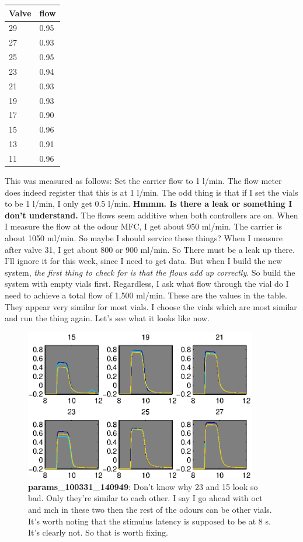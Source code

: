 \documentclass[a4paper]{report}
\begin{document}
\begin{tabular}{|l|l|}
\hline
Valve & flow \\
\hline
29&0.95\\
27&0.93\\
25&0.95\\
23&0.94\\
21&0.93\\
19&0.93\\
17&0.90\\
15&0.96\\
13&0.91\\
11&0.96\\
\hline
\end{tabular}
This was measured as follows: Set the carrier flow to 1 l/min. The
flow meter does indeed register that this is at 1 l/min. The odd thing
is that if I set the vials to be 1 l/min, I only get 0.5
l/min. \textbf{Hmmm. Is there a leak or something I don't understand.}
The flows seem additive when both controllers are on. When I measure
the flow at the odour MFC, I get about 950 ml/min. The carrier is
about 1050 ml/min. So maybe I should service these things? When I
measure after valve 31, I get about 800 or 900 ml/min. So There must
be a leak up there. I'll ignore it for this week, since I need to get
data. But when I build the new system, \textit{the first thing to
  check for is that the flows add up correctly}. So build the system
with empty vials first.  Regardless, I ask what flow through the vial
do I need to achieve a total flow of 1,500 ml/min. These are the
values in the table. They appear very similar for most vials. I choose
the vials which are most similar and run the thing again. Let's see
what it looks like now.

\begin{figure}[h]
\centering
\includegraphics[width=4in]{params_100331_140949.eps}
\caption{\textbf{params\_100331\_140949}: Don't know why 23 and 15
  look so bad. Only they're similar to each other. I say I go ahead
  with oct and mch in these two then the rest of the odours can be
  other vials. It's worth noting that the stimulus latency is supposed
to be at 8 s. It's clearly not. So that is worth fixing.}
\end{figure}
\end{document}
